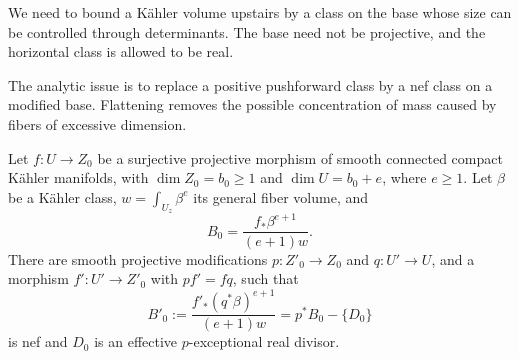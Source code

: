 We need to bound a Kähler volume upstairs by a class on the base whose
size can be controlled through determinants.  The base need not be
projective, and the horizontal class is allowed to be real.

The analytic issue is to replace a positive pushforward class by a nef
class on a modified base.  Flattening removes the possible concentration
of mass caused by fibers of excessive dimension.

\begin{lemma}\label{zero:nef-pushforward}
Let \(f:U\to Z_0\) be a surjective projective morphism of smooth connected
compact Kähler manifolds, with \(\dim Z_0=b_0\ge1\) and
\(\dim U=b_0+e\), where \(e\ge1\).  Let \(\beta\) be a Kähler class,
\(w=\int_{U_z}\beta^e\) its general fiber volume, and
\[
 B_0=\frac{f_*\beta^{e+1}}{(e+1)w}.
\]
There are smooth projective modifications \(p:Z'_0\to Z_0\) and
\(q:U'\to U\), and a morphism \(f':U'\to Z'_0\) with
\(pf'=fq\), such that
\[
 B'_0:=\frac{f'_*(q^*\beta)^{e+1}}{(e+1)w}
       =p^*B_0-\{D_0\}
\]
is nef and \(D_0\) is an effective \(p\)-exceptional real divisor.
\end{lemma}

